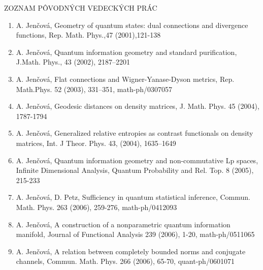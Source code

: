 \documentclass[A4paper]{article}
\begin{document}
\begin{tabular}{rl}
\end{tabular}




\newpage

\begin{center} ZOZNAM P\^OVODN\'YCH VEDECK\'YCH PR\'AC \end{center}


\begin{enumerate}
\item \label{geom} A. Jen\v cov\' a, Geometry of quantum states: dual
connections and divergence functions, Rep. Math. Phys.,47
(2001),121-138

\item \label{purif} A. Jen\v cov\'a, Quantum information geometry and standard purification,  J.Math.
Phys., 43 (2002), 2187--2201

\item \label{wyd} A. Jen\v cov\'a, Flat connections and Wigner-Yanase-Dyson metrics,
 Rep. Math.Phys. 52 (2003), 331--351, math-ph/0307057

\item \label{geodesic} A. Jen\v cov\'a, Geodesic distances on density matrices,
  J. Math. Phys. 45 (2004), 1787-1794

\item \label{contrast} A. Jen\v cov\'a,  Generalized relative entropies as contrast
functionals on density matrices, Int. J Theor. Phys. 43, (2004), 1635--1649

\item\label{lpspaces}   A. Jen\v cov\' a,  Quantum information geometry and
non-commutative Lp spaces, Infinite Dimensional Analysis, Quantum Probability
and Rel. Top. 8 (2005), 215-233

\item\label{sufficiency} A. Jen\v cov\'a, D. Petz, Sufficiency in quantum
statistical inference,  Commun. Math. Phys. 263 (2006), 259-276, math-ph/0412093


\item\label{yasp} A. Jen\v cov\'a, 
A construction of a nonparametric quantum information manifold, 
Journal of Functional Analysis 239 (2006), 1-20,  math-ph/0511065

\item\label{complete} A. Jen\v cov\'a, A relation between completely bounded norms and 
conjugate channels, Commun. Math. Phys. 266 (2006), 65-70, quant-ph/0601071


\end{enumerate}
\end{document}
